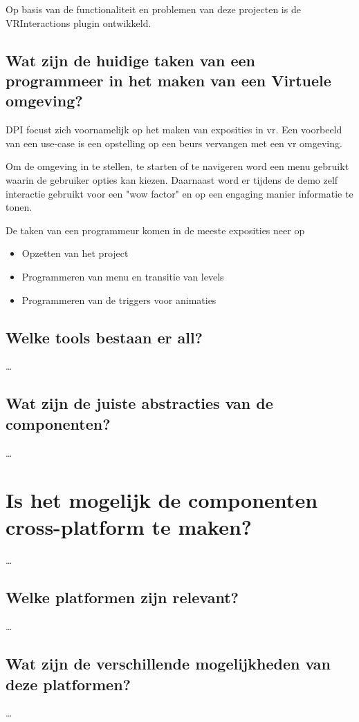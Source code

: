 Op basis van de functionaliteit en problemen van deze projecten is de VRInteractions plugin ontwikkeld.

\subsection{Wat zijn de huidige taken van een programmeer in het maken van een Virtuele omgeving?}
DPI focust zich voornamelijk op het maken van exposities in \gls{vr}. Een voorbeeld van een use-case is een opstelling op een beurs vervangen met een \gls{vr} omgeving.

Om de omgeving in te stellen, te starten of te navigeren word een menu gebruikt waarin de gebruiker opties kan kiezen. Daarnaast word er tijdens de demo zelf interactie gebruikt voor een "wow factor" en op een engaging manier informatie te tonen. 

De taken van een programmeur komen in de meeste exposities neer op

\begin{itemize}
	\item Opzetten van het project
	\item Programmeren van menu en transitie van levels
	\item Programmeren van de triggers voor animaties 
\end{itemize}

\subsection{Welke tools bestaan er all?}
\dots
\subsection{Wat zijn de juiste abstracties van de componenten?}
\dots

\section{Is het mogelijk de componenten cross-platform te maken?}
\dots
\subsection{Welke platformen zijn relevant?}
\dots
\subsection{Wat zijn de verschillende mogelijkheden van deze platformen?}
\dots